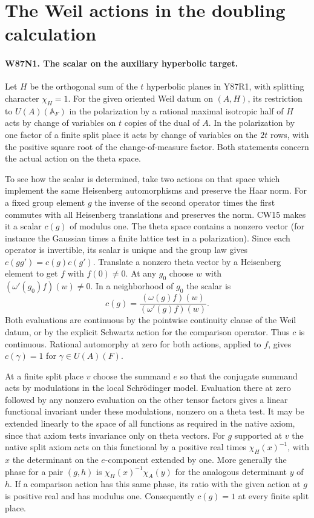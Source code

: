 \section{The Weil actions in the doubling calculation}

\paragraph{W87N1. The scalar on the auxiliary hyperbolic target.}
Let $H$ be the orthogonal sum of the $t$ hyperbolic planes in
Y87R1, with splitting character $\chi_H=1$. For the given oriented
Weil datum on $(A,H)$, its restriction to $U(A)(\mathbb A_F)$ in
the polarization by a rational maximal isotropic half of $H$ acts
by change of variables on $t$ copies of the dual of $A$.
In the polarization by one factor of a finite split place it acts
by change of variables on the $2t$ rows, with the positive square
root of the change-of-measure factor. Both statements concern the
actual action on the theta space.

To see how the scalar is determined, take two actions on that space
which implement the same Heisenberg automorphisms and preserve the
Haar norm. For a fixed group element $g$ the inverse of the second
operator times the first commutes with all Heisenberg translations
and preserves the norm. CW15 makes it a scalar $c(g)$ of modulus one.
The theta space contains a nonzero vector (for instance the Gaussian
times a finite lattice test in a polarization). Since each operator is
invertible, its scalar is unique and the group law gives
$c(gg')=c(g)c(g')$. Translate a nonzero theta vector by a Heisenberg
element to get $f$ with $f(0)\ne0$. At any $g_0$ choose $w$ with
$(\omega'(g_0)f)(w)\ne0$. In a neighborhood of $g_0$ the scalar is
\[
          c(g)=\frac{(\omega(g)f)(w)}{(\omega'(g)f)(w)} .
\]
Both evaluations are continuous by the pointwise continuity clause
of the Weil datum, or by the explicit Schwartz action for the
comparison operator. Thus $c$ is continuous. Rational automorphy
at zero for both actions, applied to $f$, gives $c(\gamma)=1$ for
$\gamma\in U(A)(F)$.

At a finite split place $v$ choose the summand $e$ so that the
conjugate summand acts by modulations in the local Schr\"odinger
model. Evaluation there at zero followed by any nonzero evaluation
on the other tensor factors gives a linear functional invariant
under these modulations, nonzero on a theta test. It may be extended
linearly to the space of all functions as required in the native
axiom, since that axiom tests invariance only on theta vectors.
For $g$ supported at $v$ the native split axiom acts on this
functional by a positive real times $\chi_H(x)^{-1}$, with $x$
the determinant on the $e$-component extended by one. More
generally the phase for a pair $(g,h)$ is
$\chi_H(x)^{-1}\chi_A(y)$ for the analogous determinant $y$ of $h$.
If a comparison action has this same phase, its ratio with the
given action at $g$ is positive real and has modulus one.
Consequently $c(g)=1$ at every finite split place.


